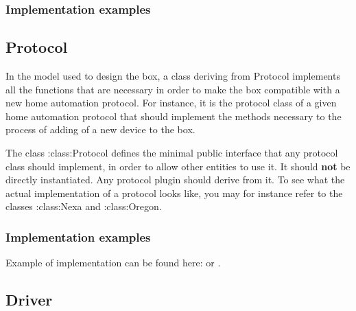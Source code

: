 \documentclass[letterpaper,10pt,english]{sphinxmanual}
\begin{document}
\subsubsection{Implementation examples}
\label{api/models:id1}

\subsection{Protocol}
\label{api/models:protocol}

\begin{fulllineitems}
\label{api/models:models.Protocol}
In the model used to design the box, a class deriving from 
Protocol implements all the functions that are necessary in
order to make the box compatible with a new home automation
protocol. For instance, it is the protocol class of a given home
automation protocol     that should implement the methods necessary 
to the process of adding of a new device to the box.

The class :class:Protocol defines the minimal public 
interface that any protocol class should implement, in order 
to allow other entities to use it.  
It should \textbf{not} be directly instantiated.
Any protocol plugin should derive from it. To see what the actual
implementation of a protocol looks like, you may for instance refer
to the classes :class:Nexa and :class:Oregon.

\end{fulllineitems}



\subsubsection{Implementation examples}
\label{api/models:id2}
Example of implementation can be found here: {\hyperref[implementation_examples:protocols.nexa.Nexa]{}} or {\hyperref[implementation_examples:protocols.oregon.Oregon]{}}.


\subsection{Driver}
\label{api/models:driver}
\end{document}
